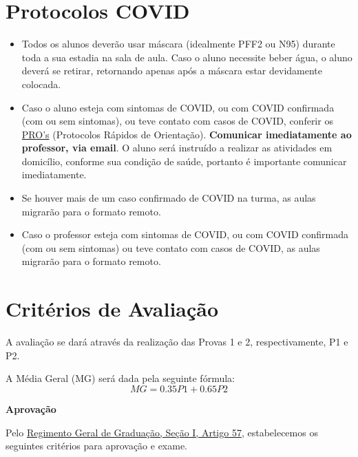 \documentclass[paper=letter, fontsize=12pt]{scrartcl} %
\begin{document}
\section{Protocolos COVID}

\begin{itemize}

\item Todos os alunos deverão usar máscara (idealmente PFF2 ou N95) durante toda a sua estadia na sala de aula. Caso o aluno necessite beber água, o aluno deverá se retirar, retornando apenas após a máscara estar devidamente colocada.

\item Caso o aluno esteja com sintomas de COVID, ou com COVID confirmada (com ou sem sintomas), ou teve contato com casos de COVID, conferir os \href{https://www.ime.unicamp.br/retomada/pros.html}{PRO's} (Protocolos Rápidos de Orientação). \textbf{Comunicar imediatamente ao professor, via email}. O aluno será instruído a realizar as atividades em domicílio, conforme sua condição de saúde, portanto é importante comunicar imediatamente.

\item Se houver mais de um caso confirmado de COVID na turma, as aulas migrarão para o formato remoto.

\item Caso o professor esteja com sintomas de COVID, ou com COVID confirmada (com ou sem sintomas) ou teve contato com casos de COVID, as aulas migrarão para o formato remoto.

\end{itemize}

\section{Critérios de Avaliação}

A avaliação se dará através da realização das Provas 1 e 2, respectivamente, P1 e P2.

\vspace{10pt}

A Média Geral (MG) será dada pela seguinte fórmula:
\[MG = 0.35 P1 + 0.65 P2\]


\textbf{Aprovação}

Pelo \href{https://www.dac.unicamp.br/portal/graduacao/regimento-geral}{{\color{blue} Regimento Geral de Graduação, Seção I, Artigo 57}}, estabelecemos os seguintes critérios para aprovação e exame.
\end{document}
